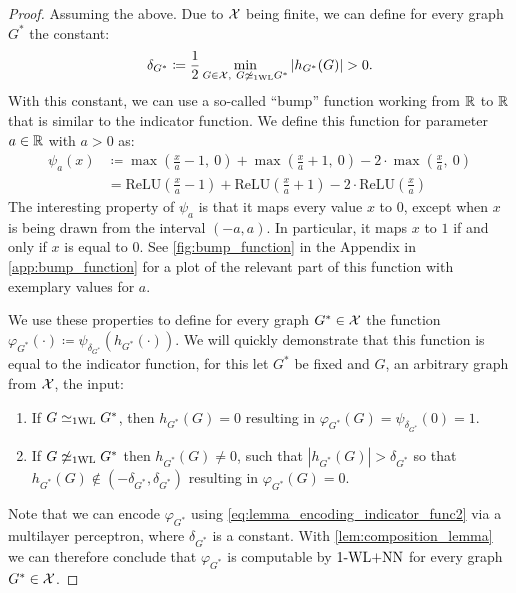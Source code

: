 \begin{proof}
    Assuming the above. Due to $\mathcal{X}$ being finite, we can define for every graph $G^*$ the constant:
    \begin{equation*}
        \delta_{G^*} \coloneqq \frac{1}{2} \min_{G \in \mathcal{X} , \  G \not\simeq_{\text{1WL}} G^*} |h_{G^*}(G)| > 0.
    \end{equation*}
    With this constant, we can use a so-called ``bump'' function working from $\mathbb{R}$ to $\mathbb{R}$ that is similar to the indicator function. We define this function for parameter $a \in \mathbb{R}$ with $a > 0$ as:
    \begin{align}\label{eq:lemma_encoding_indicator_func2}
        \psi_a(x) &\coloneqq \max(\frac{x}{a} -1,\ 0) + \max(\frac{x}{a}+1, \ 0) - 2 \cdot \max(\frac{x}{a}, \ 0) \nonumber\\
        &= \text{ReLU}(\frac{x}{a} -1) + \text{ReLU}(\frac{x}{a}+1) - 2 \cdot \text{ReLU}(\frac{x}{a})
    \end{align}
    The interesting property of $\psi_a$ is that it maps every value $x$ to $0$, except when $x$ is being drawn from the interval $(-a, a)$. In particular, it maps $x$ to $1$ if and only if $x$ is equal to $0$. See \autoref{fig:bump_function} in the Appendix in \autoref{app:bump_function} for a plot of the relevant part of this function with exemplary values for $a$.
    
    We use these properties to define for every graph ${G^*} \in \mathcal{X}$ the function $\varphi_{G^*}(\cdot) \coloneqq \psi_{\delta_{G^*}} (h_{G^*}(\cdot))$. 
    We will quickly demonstrate that this function is equal to the indicator function, for this let $G^*$ be fixed and $G$, an arbitrary graph from $\mathcal{X}$, the input:
    \begin{enumerate}
        \item If $G \simeq_{\text{1WL}} G^*$, then $h_{G^*}(G) = 0$ resulting in $\varphi_{G^*}(G) = \psi_{\delta_{G^*}}(0) = 1$.
        \item If $G \not\simeq_{\text{1WL}} G^*$ then $h_{G^*}(G) \neq 0$, such that $|h_{G^*}(G)|> \delta_{G^*}$ so that $h_{G^*}(G) \not\in (-\delta_{G^*}, \delta_{G^*}) $ resulting in $\varphi_{G^*}(G) = 0$.
    \end{enumerate}
    Note that we can encode $\varphi_{G^*}$ using \autoref{eq:lemma_encoding_indicator_func2} via a multilayer perceptron, where $\delta_{G^*}$ is a constant. With \autoref{lem:composition_lemma} we can therefore conclude that $\varphi_{G^*}$ is computable by $\text{1-WL+NN}$ for every graph ${G^*} \in \mathcal{X}$.
\end{proof}

